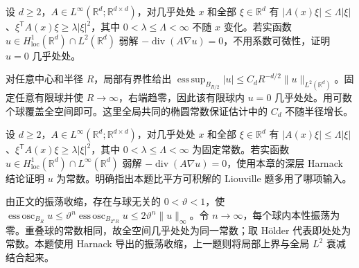 \begin{exercise}\label{b2:ex:16-l2-liouville}
设 \(d\ge2\)，\(A\in L^\infty(\mathbb R^d;\mathbb R^{d\times d})\)，对几乎处处 \(x\) 和全部 \(\xi\in\mathbb R^d\) 有 \(|A(x)\xi|\le\Lambda|\xi|\)、\(\xi^{\mathsf T}A(x)\xi\ge\lambda|\xi|^2\)，其中 \(0<\lambda\le\Lambda<\infty\) 不随 \(x\) 变化。若实函数 \(u\in H_{\mathrm{loc}}^1(\mathbb R^d)\cap L^2(\mathbb R^d)\) 弱解 \(-\operatorname{div}(A\nabla u)=0\)，不用系数可微性，证明 \(u=0\) 几乎处处。
\end{exercise}
\begin{solution}
对任意中心和半径 \(R\)，局部有界性给出 \(\operatorname*{ess\,sup}_{B_{R/2}}|u|\le C_dR^{-d/2}\lVert u\rVert_{L^2(\mathbb R^d)}\)。固定任意有限球并使 \(R\to\infty\)，右端趋零，因此该有限球内 \(u=0\) 几乎处处。用可数个球覆盖全空间即可。这里全局共同的椭圆常数保证估计中的 \(C_d\) 不随半径增长。
\end{solution}

\begin{optionalexercise}\label{b2:ex:16-bounded-liouville}
设 \(d\ge2\)，\(A\in L^\infty(\mathbb R^d;\mathbb R^{d\times d})\)，对几乎处处 \(x\) 和全部 \(\xi\in\mathbb R^d\) 有 \(|A(x)\xi|\le\Lambda|\xi|\)、\(\xi^{\mathsf T}A(x)\xi\ge\lambda|\xi|^2\)，其中 \(0<\lambda\le\Lambda<\infty\) 为固定常数。若实函数 \(u\in H_{\mathrm{loc}}^1(\mathbb R^d)\cap L^\infty(\mathbb R^d)\) 弱解 \(-\operatorname{div}(A\nabla u)=0\)，使用本章的深层 Harnack 结论证明 \(u\) 为常数。明确指出本题比平方可积解的 Liouville 题多用了哪项输入。
\end{optionalexercise}
\begin{solution}
由正文的振荡收缩，存在与球无关的 \(0<\vartheta<1\)，使 \(\operatorname*{ess\,osc}_{B_R}u\le\vartheta^n\operatorname*{ess\,osc}_{B_{2^nR}}u\le2\vartheta^n\lVert u\rVert_\infty\)。令 \(n\to\infty\)，每个球内本性振荡为零。重叠球的常数相同，故全空间几乎处处为同一常数；取 Hölder 代表即处处为常数。本题使用 Harnack 导出的振荡收缩，上一题则将局部上界与全局 \(L^2\) 衰减结合起来。
\end{solution}

